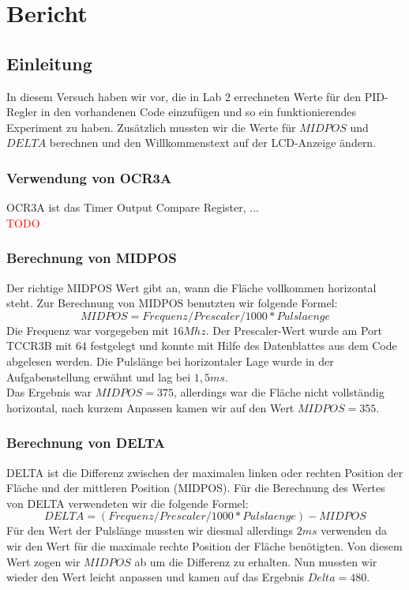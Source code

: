 \section{Bericht}

\subsection{Einleitung}
In diesem Versuch haben wir vor, die in Lab 2 errechneten Werte für den PID-Regler in den vorhandenen Code einzufügen und so ein funktionierendes Experiment zu haben. Zusätzlich mussten wir die Werte für $MIDPOS$ und $DELTA$ berechnen und den Willkommenstext auf der LCD-Anzeige ändern.

\subsubsection{Verwendung von OCR3A}
OCR3A ist das Timer Output Compare Register, ...\\
\textcolor{red}{TODO}

\subsubsection{Berechnung von MIDPOS}
Der richtige MIDPOS Wert gibt an, wann die Fläche vollkommen horizontal steht. Zur Berechnung von MIDPOS benutzten wir folgende Formel: \\
\begin{equation}
MIDPOS  = Frequenz / Prescaler / 1000 * Pulslaenge
\end{equation}
Die Frequenz war vorgegeben mit $16 Mhz$. Der Prescaler-Wert wurde am Port TCCR3B mit $64$ festgelegt und konnte mit Hilfe des Datenblattes aus dem Code abgelesen werden. Die Pulslänge bei horizontaler Lage wurde in der Aufgabenstellung erwähnt und lag bei $1,5 ms$.\\
Das Ergebnis war $MIDPOS = 375$, allerdings war die Fläche nicht vollständig horizontal, nach kurzem Anpassen kamen wir auf den Wert $MIDPOS = 355$.

\subsubsection{Berechnung von DELTA}
DELTA ist die Differenz zwischen der maximalen linken oder rechten Position der Fläche und der mittleren Position (MIDPOS). Für die Berechnung des Wertes von DELTA verwendeten wir die folgende Formel:
\begin{equation}
DELTA = (Frequenz / Prescaler / 1000 * Pulslaenge) - MIDPOS
\end{equation}
Für den Wert der Pulslänge mussten wir diesmal allerdings $2 ms$ verwenden da wir den Wert für die maximale rechte Position der Fläche benötigten. Von diesem Wert zogen wir $MIDPOS$ ab um die Differenz zu erhalten. Nun mussten wir wieder den Wert leicht anpassen und kamen auf das Ergebnis $Delta = 480$.

